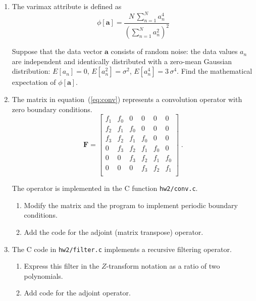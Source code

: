\begin{enumerate}

\item The varimax attribute is defined as
\begin{equation}
  \label{eq:varimax}
\phi[\mathbf{a}] = \frac{\displaystyle N\,\sum\limits_{n=1}^N
  a_n^4}{\displaystyle \left(\sum\limits_{n=1}^{N} a_n^2\right)^2}
\end{equation}

Suppose that the data vector $\mathbf{a}$ consists of random noise:
the data values $a_n$ are independent and identically distributed with
a zero-mean Gaussian distribution: $E[a_n]=0$, $E[a_n^2]=\sigma^2$,
$E[a_n^4]=3\,\sigma^4$. Find the mathematical expectation of
$\phi[\mathbf{a}]$.

\item The matrix in equation~(\ref{eq:conv}) represents a convolution operator with zero boundary conditions.
\begin{equation}
\label{eq:conv}
\mathbf{F} = \left[\begin{array}{llllll}
f_1 & f_0 & 0   & 0   & 0   & 0   \\
f_2 & f_1 & f_0 & 0   & 0   & 0   \\
f_3 & f_2 & f_1 & f_0 & 0   & 0   \\
0   & f_3 & f_2 & f_1 & f_0 & 0   \\
0   & 0   & f_3 & f_2 & f_1 & f_0 \\
0   & 0   & 0   & f_3 & f_2 & f_1 \\
\end{array}\right]\;.
\end{equation}

The operator is implemented in the C function \texttt{hw2/conv.c}.

\lstset{language=c,numbers=left,numberstyle=\tiny,showstringspaces=false}


\begin{enumerate}
\item Modify the matrix and the program to implement periodic boundary conditions.
\item Add the code for the adjoint (matrix transpose) operator.
\end{enumerate}

\item The C code in \texttt{hw2/filter.c} implements a recursive filtering
  operator.

\lstset{language=c,numbers=left,numberstyle=\tiny,showstringspaces=false}


\begin{enumerate}
\item Express this filter in the $Z$-transform notation as a ratio
  of two polynomials.
\item Add code for the adjoint operator.
\end{enumerate}

\end{enumerate}

